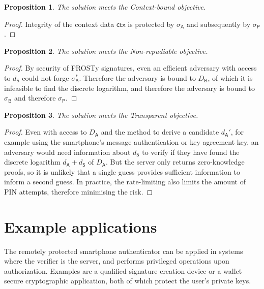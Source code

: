 \documentclass[a4paper]{article}
\newtheorem*{proposition}{Proposition}
\begin{document}
\begin{proposition}
The solution meets the Context-bound objective.
\end{proposition}

\begin{proof}
Integrity of the context data $\mathsf{ctx}$ is protected by $\sigma_\mathsf A$ and subsequently by $\sigma_\mathsf P$.
\end{proof}

\begin{proposition}
The solution meets the Non-repudiable objective.
\end{proposition}

\begin{proof}
By security of FROSTy signatures, even an efficient adversary with access to $d_\mathsf S$ could not forge $\sigma_\mathsf A^*$. Therefore the adversary is bound to $D_\mathsf B$, of which it is infeasible to find the discrete logarithm, and therefore the adversary is bound to $\sigma_\mathsf B$ and therefore $\sigma_\mathsf P$.
\end{proof}

\begin{proposition}
The solution meets the Transparent objective.
\end{proposition}

\begin{proof}
Even with access to $D_\mathsf A$ and the method to derive a candidate $d_\mathsf A'$, for example using the smartphone’s message authentication or key agreement key, an adversary would need information about $d_\mathsf S$ to verify if they have found the discrete logarithm $d_\mathsf A+d_\mathsf S$ of $D_\mathsf A$. But the server only returns zero-knowledge proofs, so it is unlikely that a single guess provides sufficient information to inform a second guess. In practice, the rate-limiting also limits the amount of PIN attempts, therefore minimising the risk.
\end{proof}

\section{Example applications}

The remotely protected smartphone authenticator can be applied in systems where the verifier is the server, and performs privileged operations upon authorization. Examples are a qualified signature creation device \cite{EN419241-1:2018} or a wallet secure cryptographic application, both of which protect the user’s private keys.
\end{document}
